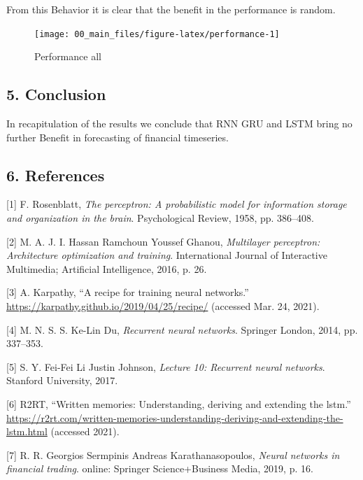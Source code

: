 \documentclass[
]{article}
\newenvironment{cslreferences}%
  {}%
  {\par}
\begin{document}
From this Behavior it is clear that the benefit in the performance is
random.

\begin{figure}

{\centering \texttt{[image: 00\_main\_files/figure-latex/performance-1]} 

}

\caption{Performance all}\label{fig:performance}
\end{figure}

\newpage

\hypertarget{conclusion}{%
\subsection{5. Conclusion}\label{conclusion}}

In recapitulation of the results we conclude that RNN GRU and LSTM bring
no further Benefit in forecasting of financial timeseries.

\newpage

\hypertarget{references}{%
\subsection{6. References}\label{references}}

\hypertarget{refs}{}
\begin{cslreferences}
\leavevmode\hypertarget{ref-perceptron_paper}{}%
{[}1{]} F. Rosenblatt, \emph{The perceptron: A probabilistic model for
information storage and organization in the brain}. Psychological
Review, 1958, pp. 386--408.

\leavevmode\hypertarget{ref-mlp_architecture}{}%
{[}2{]} M. A. J. I. Hassan Ramchoun Youssef Ghanou, \emph{Multilayer
perceptron: Architecture optimization and training}. International
Journal of Interactive Multimedia; Artificial Intelligence, 2016, p. 26.

\leavevmode\hypertarget{ref-recipe_training}{}%
{[}3{]} A. Karpathy, ``A recipe for training neural networks.''
\url{https://karpathy.github.io/2019/04/25/recipe/} (accessed Mar. 24,
2021).

\leavevmode\hypertarget{ref-RNN}{}%
{[}4{]} M. N. S. S. Ke-Lin Du, \emph{Recurrent neural networks}.
Springer London, 2014, pp. 337--353.

\leavevmode\hypertarget{ref-RNN_Stanford}{}%
{[}5{]} S. Y. Fei-Fei Li Justin Johnson, \emph{Lecture 10: Recurrent
neural networks}. Stanford University, 2017.

\leavevmode\hypertarget{ref-GRU_LSTM}{}%
{[}6{]} R2RT, ``Written memories: Understanding, deriving and extending
the lstm.''
\url{https://r2rt.com/written-memories-understanding-deriving-and-extending-the-lstm.html}
(accessed 2021).

\leavevmode\hypertarget{ref-nnfin}{}%
{[}7{]} R. R. Georgios Sermpinis Andreas Karathanasopoulos, \emph{Neural
networks in financial trading}. online: Springer Science+Business Media,
2019, p. 16.
\end{cslreferences}
\end{document}
